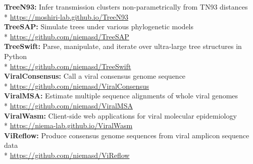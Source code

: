 \documentclass[margin,line]{res}
\begin{document}
\begin{resume}
\textbf{TreeN93:} Infer transmission clusters non-parametrically from TN93 distances\\*\vspace{2mm}
\hspace*{4mm} \href{https://moshiri-lab.github.io/TreeN93}{https://moshiri-lab.github.io/TreeN93}\\
\textbf{TreeSAP:} Simulate trees under various phylogenetic models\\*\vspace{2mm}
\hspace*{4mm} \href{https://github.com/niemasd/TreeSAP}{https://github.com/niemasd/TreeSAP}\\
\textbf{TreeSwift:} Parse, manipulate, and iterate over ultra-large tree structures in Python\\*\vspace{2mm}
\hspace*{4mm} \href{https://github.com/niemasd/TreeSwift}{https://github.com/niemasd/TreeSwift}\\
\textbf{ViralConsensus:} Call a viral consensus genome sequence\\*\vspace{2mm}
\hspace*{4mm} \href{https://github.com/niemasd/ViralConsensus}{https://github.com/niemasd/ViralConsensus}\\
\textbf{ViralMSA:} Estimate multiple sequence alignments of whole viral genomes\\*\vspace{2mm}
\hspace*{4mm} \href{https://github.com/niemasd/ViralMSA}{https://github.com/niemasd/ViralMSA}\\
\textbf{ViralWasm:} Client-side web applications for viral molecular epidemiology\\*\vspace{2mm}
\hspace*{4mm} \href{https://niema-lab.github.io/ViralWasm}{https://niema-lab.github.io/ViralWasm}\\
\textbf{ViReflow:} Produce consensus genome sequences from viral amplicon sequence data\\*\vspace{2mm}
\hspace*{4mm} \href{https://github.com/niemasd/ViralMSA}{https://github.com/niemasd/ViReflow}\\


\end{resume}
\end{document}
